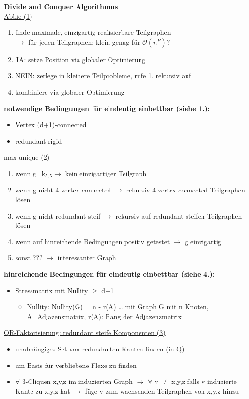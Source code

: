 \documentclass[12pt,a4paper]{article}
\begin{document}
\textbf{Divide and Conquer Algorithmus}\\
\underline{Abbie (1)}
\begin{enumerate}
	\item finde maximale, einzigartig realisierbare Teilgraphen\\ $\rightarrow$ für jeden Teilgraphen: klein genug für $\mathcal{O}(n^P)$?
	\item JA: setze Position via globaler Optimierung
	\item NEIN: zerlege in kleinere Teilprobleme, rufe 1. rekursiv auf
	\item kombiniere via globaler Optimierung
\end{enumerate}

\textbf{notwendige Bedingungen für eindeutig einbettbar (siehe 1.):}
\begin{itemize}
	\item Vertex (d+1)-connected
	\item redundant rigid
\end{itemize}

\underline{max unique (2)}
\begin{enumerate}
	\item wenn g=k$_{5,5} \rightarrow$ kein einzigartiger Teilgraph
	\item wenn g nicht 4-vertex-connected $\rightarrow$ rekursiv 4-vertex-connected Teilgraphen lösen
	\item wenn g nicht redundant steif $\rightarrow$ rekursiv auf redundant steifen Teilgraphen lösen
	\item wenn auf hinreichende Bedingungen positiv getestet $\rightarrow$ g einzigartig
	\item sonst ??? $\rightarrow$ interessanter Graph
\end{enumerate}

\textbf{hinreichende Bedingungen für eindeutig einbettbar (siehe 4.):}
\begin{itemize}
	\item Stressmatrix mit Nullity $\geq$ d+1
	\begin{itemize}
		\item Nullity: Nullity(G) = n - r(A) … mit Graph G mit n Knoten, A=Adjazenzmatrix, r(A): Rang der Adjazenzmatrix
	\end{itemize}
\end{itemize}

\parbox{\linewidth}{
\underline{QR-Faktorisierung: redundant steife Komponenten (3)}\\
\begin{itemize}
	\item unabhängiges Set von redundanten Kanten finden (in Q)
	\item um Basis für verbliebene Flexe zu finden
	\item $\forall$ 3-Cliquen x,y,z im induzierten Graph $\rightarrow$ $\forall$ v $\neq$ x,y,z falls v induzierte Kante zu x,y,z hat $\rightarrow$ füge v zum wachsenden Teilgraphen von x,y,z hinzu
\end{itemize}
}
\end{document}
